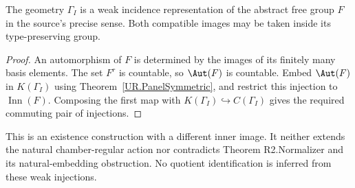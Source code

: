 \begin{corollary}
\label{UR.WeakFree}
The geometry $\Gamma_I$ is a weak incidence representation of the
abstract free group $F$ in the source's precise sense. Both compatible
images may be taken inside its type-preserving group.
\end{corollary}
\begin{proof}
An automorphism of $F$ is determined by the images of its finitely many
basis elements. The set $F^r$ is countable, so $\Aut(F)$ is countable.
Embed $\Aut(F)$ in $K(\Gamma_I)$ using
Theorem~\ref{UR.PanelSymmetric}, and restrict this injection to
$\operatorname{Inn}(F)$. Composing the first map with
$K(\Gamma_I)\hookrightarrow C(\Gamma_I)$ gives the required commuting
pair of injections.
\end{proof}
This is an existence construction with a different inner image. It
neither extends the natural chamber-regular action nor contradicts
Theorem R2.Normalizer and its natural-embedding obstruction. No quotient
identification is inferred from these weak injections.
